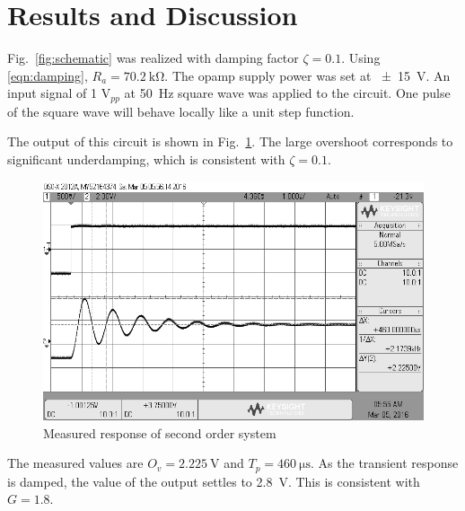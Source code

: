 \section{Results and Discussion}\label{sec:results-and-discussion}
Fig.~\ref{fig:schematic} was realized with damping factor $\zeta = 0.1$.
Using \eqref{eqn:damping}, $R_a = \SI{70.2}{\kilo\ohm}$.
The opamp supply power was set at \SI{+-15}{\volt}.
An input signal of 1 $\si{\volt}_{pp}$ at \SI{50}{\hertz} square wave was applied to the circuit.
One pulse of the square wave will behave locally like a unit step function.

The output of this circuit is shown in Fig.~\ref{fig:overshoot}.
The large overshoot corresponds to significant underdamping, which is consistent with $\zeta = 0.1$.

\pagebreak

\begin{figure}[tbph]
	\centering
	\includegraphics[width=0.7\linewidth]{graphics/overshoot}
	\caption{Measured response of second order system}
	\label{fig:overshoot}
\end{figure}

The measured values are $O_v = \SI{2.225}{\volt}$ and $T_p = \SI{460}{\micro\second}$.
As the transient response is damped, the value of the output settles to \SI{2.8}{\volt}.
This is consistent with $G = 1.8$.
